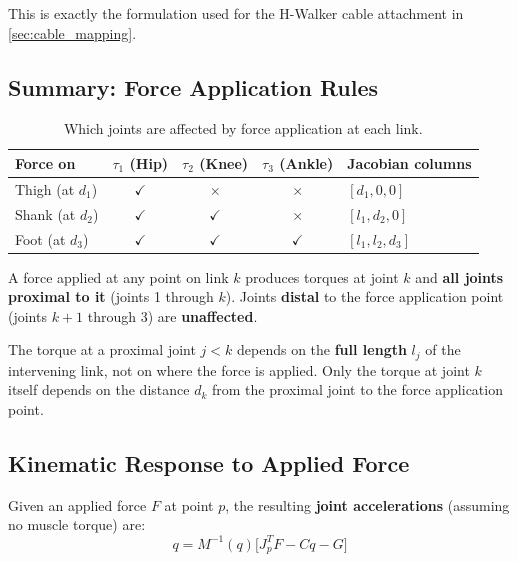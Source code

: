 \documentclass[11pt,a4paper]{article}
\newcommand{\vc}[1]{\bm{#1}}
\newcommand{\mat}[1]{\bm{#1}}
\newcommand{\dt}[1]{\dot{#1}}
\newcommand{\ddt}[1]{\ddot{#1}}
\def\vc#1{#1}%
\def\mat#1{#1}%
\def\dt#1{#1}%
\def\ddt#1{#1}%
\def\bm#1{#1}%
\begin{document}
This is exactly the formulation used for the H-Walker cable attachment
in \cref{sec:cable_mapping}.

\subsection{Summary: Force Application Rules}

\begin{table}[H]
\centering
\caption{Which joints are affected by force application at each link.}
\label{tab:force_rules}
\begin{tabular}{@{}lccc l@{}}
\toprule
\textbf{Force on} & $\tau_1$ (Hip) & $\tau_2$ (Knee) & $\tau_3$ (Ankle) & \textbf{Jacobian columns} \\
\midrule
Thigh (at $d_1$) & $\checkmark$ & $\times$ & $\times$ & $[d_1, 0, 0]$ \\
Shank (at $d_2$) & $\checkmark$ & $\checkmark$ & $\times$ & $[l_1, d_2, 0]$ \\
Foot  (at $d_3$) & $\checkmark$ & $\checkmark$ & $\checkmark$ & $[l_1, l_2, d_3]$ \\
\bottomrule
\end{tabular}
\end{table}

\begin{keybox}
A force applied at any point on link $k$ produces torques at joint $k$
and \textbf{all joints proximal to it} (joints 1 through $k$).
Joints \textbf{distal} to the force application point (joints $k+1$ through 3)
are \textbf{unaffected}.

\smallskip
The torque at a proximal joint $j < k$ depends on the \textbf{full length}
$l_j$ of the intervening link, not on where the force is applied.
Only the torque at joint $k$ itself depends on the distance $d_k$ from
the proximal joint to the force application point.
\end{keybox}

\subsection{Kinematic Response to Applied Force}

Given an applied force $\vc{F}$ at point $\vc{p}$, the resulting
\textbf{joint accelerations} (assuming no muscle torque) are:
\begin{equation}
\boxed{
    \ddt{\vc{q}} = \mat{M}^{-1}(\vc{q})\bigl[\vc{J}_p^T \vc{F} - \vc{C}\dt{\vc{q}} - \vc{G}\bigr]
}
\label{eq:accel_from_force}
\end{equation}
\end{document}
